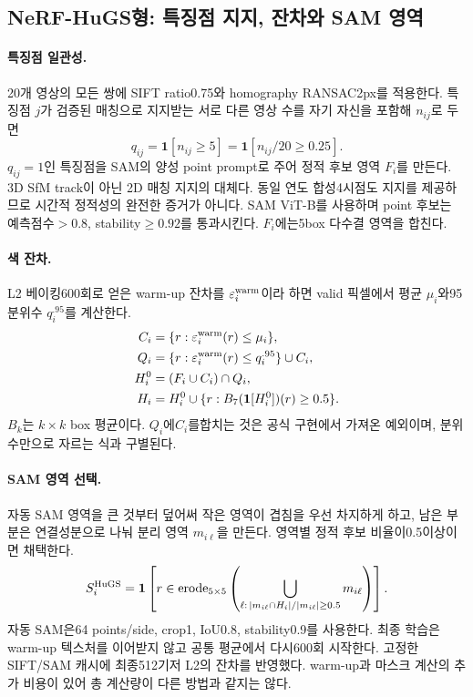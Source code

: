 \documentclass[11pt,a4paper]{article}
\newcommand{\ind}{\mathbf{1}}
\newcommand{\erode}{\operatorname{erode}}
\begin{document}
\subsection{NeRF-HuGS형: 특징점 지지, 잔차와 SAM 영역}
\paragraph{특징점 일관성.}
20개 영상의 모든 쌍에 SIFT ratio0.75와 homography RANSAC2px를 적용한다. 특징점 $j$가 검증된 매칭으로 지지받는 서로 다른 영상 수를 자기 자신을 포함해 $n_{ij}$로 두면
\begin{equation}
 q_{ij}=\ind[n_{ij}\ge5]=\ind[n_{ij}/20\ge0.25].
\end{equation}
$q_{ij}=1$인 특징점을 SAM의 양성 point prompt로 주어 정적 후보 영역 $F_i$를 만든다. 3D SfM track이 아닌 2D 매칭 지지의 대체다. 동일 연도 합성4시점도 지지를 제공하므로 시간적 정적성의 완전한 증거가 아니다. SAM ViT-B를 사용하며 point 후보는 예측점수$>0.8$, stability$\ge0.92$를 통과시킨다. $F_i$에는5box 다수결 영역을 합친다.

\paragraph{색 잔차.}
L2 베이킹600회로 얻은 warm-up 잔차를 $\varepsilon_i^{\rm warm}$이라 하면 valid 픽셀에서 평균 $\mu_i$와95분위수 $q_i^{.95}$를 계산한다.
\begin{align}
 C_i&=\{r:\varepsilon_i^{\rm warm}(r)\le\mu_i\},\\
 Q_i&=\{r:\varepsilon_i^{\rm warm}(r)\le q_i^{.95}\}\cup C_i,\\
 H_i^0&=(F_i\cup C_i)\cap Q_i,\\
 H_i&=H_i^0\cup\{r:B_7(\ind[H_i^0])(r)\ge0.5\}.
\end{align}
$B_k$는 $k\times k$ box 평균이다. $Q_i$에$C_i$를합치는 것은 공식 구현에서 가져온 예외이며, 분위수만으로 자르는 식과 구별된다.

\paragraph{SAM 영역 선택.}
자동 SAM 영역을 큰 것부터 덮어써 작은 영역이 겹침을 우선 차지하게 하고, 남은 부분은 연결성분으로 나눠 분리 영역 $m_{i\ell}$을 만든다. 영역별 정적 후보 비율이0.5이상이면 채택한다.
\begin{equation}
 S_i^{\rm HuGS}=
 \ind\left[r\in\erode_{5\times5}\left(
 \bigcup_{\ell:\,|m_{i\ell}\cap H_i|/|m_{i\ell}|\ge0.5}m_{i\ell}
 \right)\right].
\end{equation}
자동 SAM은64 points/side, crop1, IoU0.8, stability0.9를 사용한다. 최종 학습은 warm-up 텍스처를 이어받지 않고 공통 평균에서 다시600회 시작한다. 고정한 SIFT/SAM 캐시에 최종512기저 L2의 잔차를 반영했다. warm-up과 마스크 계산의 추가 비용이 있어 총 계산량이 다른 방법과 같지는 않다.
\end{document}
